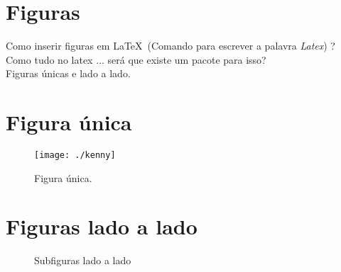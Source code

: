 \documentclass[12pt, a4paper]{article}
\begin{document}
\section{Figuras}
Como inserir figuras em \LaTeX\ (Comando para escrever a palavra \emph{Latex}) ? \\
Como tudo no latex $\ldots$ será que existe um pacote para isso? 		\\
Figuras únicas e lado a lado.

\section{Figura única}
\begin{figure}[!htb]
    \centering
    
    \caption{Figura única.}
	
    \texttt{[image: ./kenny]}
	
    \label{grafico_car}
\end{figure}

\newpage

\section{Figuras lado a lado}
\begin{figure}[!htb]

\centering


\quad 


\caption{Subfiguras lado a lado}
\label{fig01}
\end{figure}
\end{document}
